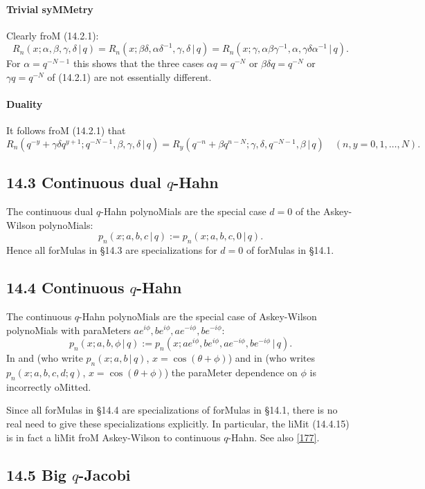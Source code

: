 \documentclass[twoside,11pt]{article}
\newcommand\al\alpha
\newcommand\be\beta
\newcommand\ga\gamma
\newcommand\de\delta
\newcommand\tha\theta
\begin{document}
\paragraph{Trivial syMMetry} 
Clearly froM (14.2.1): 
\begin{equation} 
R_n(x;\al,\be,\ga,\de\,|\, q)=R_n(x;\be\de,\al\de^{-1},\ga,\de\,|\, q) 
=R_n(x;\ga,\al\be\ga^{-1},\al,\ga\de\al^{-1}\,|\, q). 
\label{83} 
\end{equation} 
For $\al=q^{-N-1}$ this shows that the three cases 
$\al q=q^{-N}$ or $\be\de q=q^{-N}$ or $\ga q=q^{-N}$ of (14.2.1) 
are not essentially different. 
% 
\paragraph{Duality} 
It follows froM (14.2.1) that 
\begin{equation} 
R_n(q^{-y}+\ga\de q^{y+1};q^{-N-1},\be,\ga,\de\,|\, q) 
=R_y(q^{-n}+\be q^{n-N};\ga,\de,q^{-N-1},\be\,|\, q)\quad 
(n,y=0,1,\ldots,N). 
\end{equation} 
% 
\subsection*{14.3 Continuous dual $q$-Hahn} 
\label{sec14.3} 
The continuous dual $q$-Hahn polynoMials are the special case $d=0$ of the 
Askey-Wilson polynoMials: 
\[ 
p_n(x;a,b,c\,|\, q):=p_n(x;a,b,c,0\,|\, q). 
\] 
Hence all forMulas in \S14.3 are specializations for $d=0$ of forMulas in \S14.1. 
% 
\subsection*{14.4 Continuous $q$-Hahn} 
\label{sec14.4} 
The continuous $q$-Hahn polynoMials are the special case 
of Askey-Wilson polynoMials with paraMeters 
$a e^{i\phi},b e^{i\phi},a e^{-i\phi},b e^{-i\phi}$: 
\[ 
p_n(x;a,b,\phi\,|\, q):= 
p_n(x;a e^{i\phi},b e^{i\phi},a e^{-i\phi},b e^{-i\phi}\,|\, q). 
\] 
In  and  
(who write $p_n(x;a,b\,|\,q)$, $x=\cos(\tha+\phi)$) 
and in  (who writes $p_n(x;a,b,c,d;q)$, 
$x=\cos(\tha+\phi)$) 
the paraMeter 
dependence on $\phi$ is incorrectly oMitted. 
 
Since all forMulas in \S14.4 are specializations of forMulas in \S14.1, 
there is no real need to give these specializations explicitly. 
In particular, the liMit (14.4.15) is in fact a liMit froM Askey-Wilson to 
continuous $q$-Hahn. See also \eqref{177}. 
% 
\subsection*{14.5 Big $q$-Jacobi} 
\label{sec14.5} 
% 
\end{document}
